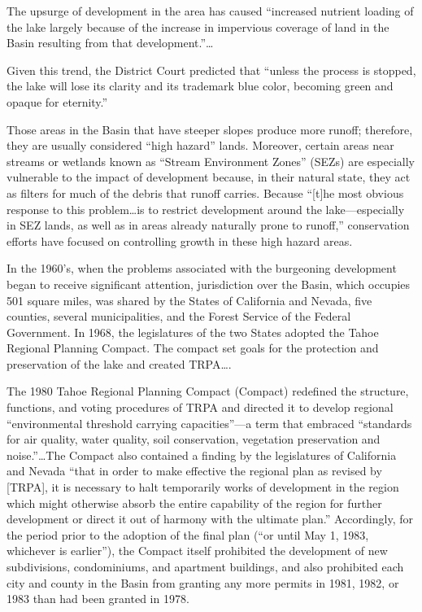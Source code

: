 The upsurge of development in the area has caused ``increased nutrient loading
of the lake largely because of the increase in impervious coverage of land in
the Basin resulting from that development.''\ldots 

Given this trend, the District Court predicted that ``unless the process is
stopped, the lake will lose its clarity and its trademark blue color, becoming
green and opaque for eternity.''

Those areas in the Basin that have steeper slopes produce more runoff;
therefore, they are usually considered ``high hazard'' lands. Moreover, certain
areas near streams or wetlands known as ``Stream Environment Zones'' (SEZs) are
especially vulnerable to the impact of development because, in their natural
state, they act as filters for much of the debris that runoff carries. Because
``[t]he most obvious response to this problem\ldots is to restrict development
around the lake---especially in SEZ lands, as well as in areas already naturally
prone to runoff,'' conservation efforts have focused on controlling growth in
these high hazard areas.

In the 1960's, when the problems associated with the burgeoning development
began to receive significant attention, jurisdiction over the Basin, which
occupies 501 square miles, was shared by the States of California and Nevada,
five counties, several municipalities, and the Forest Service of the Federal
Government. In 1968, the legislatures of the two States adopted the Tahoe
Regional Planning Compact. The compact set goals for the protection and
preservation of the lake and created TRPA\ldots.

The 1980 Tahoe Regional Planning Compact (Compact) redefined the structure,
functions, and voting procedures of TRPA and directed it to develop regional
``environmental threshold carrying capacities''---a term that embraced
``standards for air quality, water quality, soil conservation, vegetation
preservation and noise.''\ldots The Compact also contained a finding by the
legislatures of California and Nevada ``that in order to make effective the
regional plan as revised by [TRPA], it is necessary to halt temporarily works of
development in the region which might otherwise absorb the entire capability of
the region for further development or direct it out of harmony with the ultimate
plan.'' Accordingly, for the period prior to the adoption of the final plan
(``or until May 1, 1983, whichever is earlier''), the Compact itself prohibited
the development of new subdivisions, condominiums, and apartment buildings, and
also prohibited each city and county in the Basin from granting any more permits
in 1981, 1982, or 1983 than had been granted in 1978.

